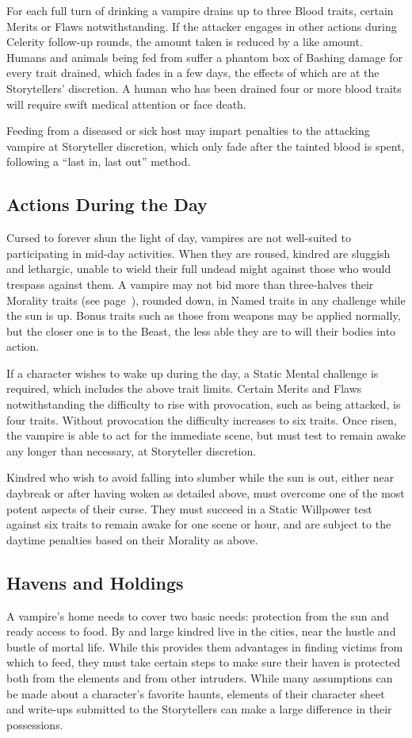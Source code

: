 For each full turn of drinking a vampire drains up to three Blood traits, certain Merits or Flaws 
notwithstanding.  If the attacker engages in other actions during Celerity follow-up rounds, the amount 
taken is reduced by a like amount.  Humans and animals being fed from suffer a phantom box of Bashing damage 
for every trait drained, which fades in a few days, the effects of which are at the Storytellers' discretion.  
A human who has been drained four or more blood traits will require swift medical attention or face death.

Feeding from a diseased or sick host may impart penalties to the attacking vampire at Storyteller 
discretion, which only fade after the tainted blood is spent, following a ``last in, last out'' method.

\subsection{Actions During the Day}
Cursed to forever shun the light of day, vampires are not well-suited to participating in 
mid-day activities.  When they are roused, kindred are sluggish and lethargic, unable to 
wield their full undead might against those who would trespass against them.  A vampire 
may not bid more than three-halves their Morality traits (see page~\pageref{sec:morality}), 
rounded down, in Named traits in any challenge while the sun is up.  Bonus traits such as 
those from weapons may be applied normally, but the closer one is to the Beast, the less 
able they are to will their bodies into action.

If a character wishes to wake up during the day, a Static Mental challenge is required, which 
includes the above trait limits.  Certain Merits and Flaws notwithstanding the difficulty 
to rise with provocation, such as being attacked, is four traits.  Without provocation the 
difficulty increases to six traits.  Once risen, the vampire is able to act for the immediate 
scene, but must test to remain awake any longer than necessary, at Storyteller discretion.

Kindred who wish to avoid falling into slumber while the sun is out, either near daybreak or 
after having woken as detailed above, must overcome one of the most potent aspects of their 
curse.  They must succeed in a Static Willpower test against six traits to remain awake for 
one scene or hour, and are subject to the daytime penalties based on their Morality as above.

\subsection{Havens and Holdings}
A vampire's home needs to cover two basic needs:  protection from the sun and ready access to 
food.  By and large kindred live in the cities, near the hustle and bustle of mortal life.  
While this provides them advantages in finding victims from which to feed, they must take 
certain steps to make sure their haven is protected both from the elements and from other 
intruders.  While many assumptions can be made about a character's favorite haunts, elements 
of their character sheet and write-ups submitted to the Storytellers can make a large difference 
in their possessions.

